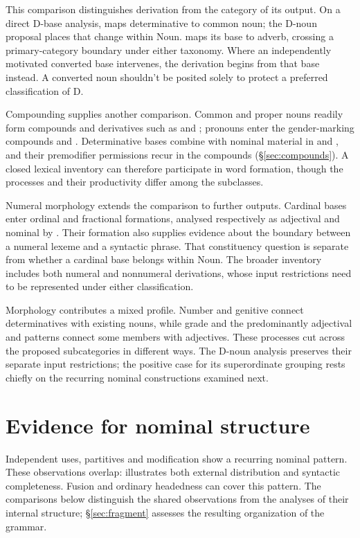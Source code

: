 \documentclass[12pt]{article}
\begin{document}
This comparison distinguishes derivation from the category of its output. On a direct D-base analysis,  maps determinative to common noun; the D-noun proposal places that change within Noun.  maps its base to adverb, crossing a primary-category boundary under either taxonomy. Where an independently motivated converted base intervenes, the derivation begins from that base instead. A converted noun shouldn't be posited solely to protect a preferred classification of D.

Compounding supplies another comparison. Common and proper nouns readily form compounds and derivatives such as  and ; pronouns enter the gender-marking compounds  and  \citep[Ch.~19, §§5.3, 5.6.2(b), 5.7.2(k)]{huddleston2002}. Determinative bases combine with nominal material in  and , and their premodifier permissions recur in the compounds (§\ref{sec:compounds}). A closed lexical inventory can therefore participate in word formation, though the processes and their productivity differ among the subclasses.

Numeral morphology extends the comparison to further outputs. Cardinal bases enter ordinal and fractional formations, analysed respectively as adjectival and nominal by \textcite{reynolds2026numerals}. Their formation also supplies evidence about the boundary between a numeral lexeme and a syntactic phrase. That constituency question is separate from whether a cardinal base belongs within Noun. The broader inventory includes both numeral and nonnumeral derivations, whose input restrictions need to be represented under either classification.

Morphology contributes a mixed profile. Number and genitive connect determinatives with existing nouns, while grade and the predominantly adjectival  and  patterns connect some members with adjectives. These processes cut across the proposed subcategories in different ways. The D-noun analysis preserves their separate input restrictions; the positive case for its superordinate grouping rests chiefly on the recurring nominal constructions examined next.

\section{Evidence for nominal structure}\label{sec:evidence}

Independent uses, partitives and modification show a recurring nominal pattern. These observations overlap:  illustrates both external distribution and syntactic completeness. Fusion and ordinary headedness can cover this pattern. The comparisons below distinguish the shared observations from the analyses of their internal structure; §\ref{sec:fragment} assesses the resulting organization of the grammar.
\end{document}
